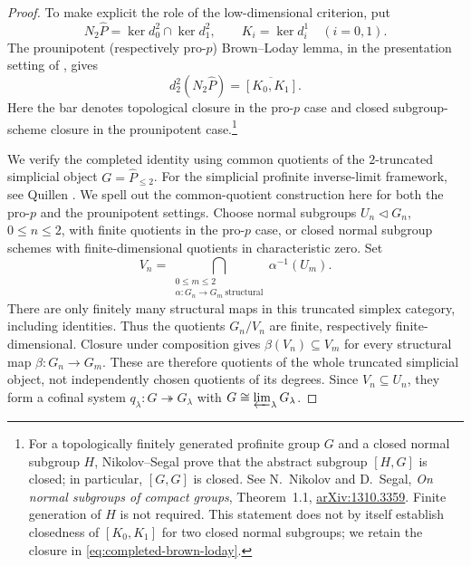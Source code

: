 \documentclass[11pt,a4paper]{article}
\begin{document}
\begin{proof}
To make explicit the role of the low-dimensional criterion, put
\[
 N_2\widehat P=\ker d_0^2\cap\ker d_1^2,
 \qquad K_i=\ker d_i^1\quad(i=0,1).
\]
The prounipotent (respectively pro-$p$) Brown--Loday lemma, in the
presentation setting of \cite[Section~4.3]{Mikh2023}, gives
\begin{equation}\label{eq:completed-brown-loday}
 d_2^2(N_2\widehat P)=\overline{[K_0,K_1]}.
\end{equation}
Here the bar denotes topological closure in the pro-$p$ case and closed
subgroup-scheme closure in the prounipotent case.\footnote{For a topologically finitely generated profinite group $G$
and a closed normal subgroup $H$, Nikolov--Segal prove that the abstract
subgroup $[H,G]$ is closed; in particular, $[G,G]$ is closed.
See N.~Nikolov and D.~Segal, \emph{On normal subgroups of compact groups},
Theorem~1.1, \href{https://arxiv.org/abs/1310.3359}{arXiv:1310.3359}.
Finite generation of $H$ is not required.  This statement does not by
itself establish closedness of $[K_0,K_1]$ for two closed normal subgroups;
we retain the closure in \eqref{eq:completed-brown-loday}.}

We verify the completed identity using common quotients of the
$2$-truncated simplicial object $G=\widehat P_{\leq2}$.
For the simplicial profinite inverse-limit framework, see Quillen
\cite{QUILLEN69}.  We spell out the common-quotient construction here
for both the pro-$p$ and the prounipotent settings.
Choose normal subgroups $U_n\triangleleft G_n$, $0\leq n\leq2$, with
finite quotients in the pro-$p$ case, or closed normal subgroup schemes
with finite-dimensional quotients in characteristic zero.  Set
\[
 V_n=\bigcap_{\substack{0\leq m\leq2\\
              \alpha:G_n\to G_m\ \mathrm{structural}}}
              \alpha^{-1}(U_m).
\]
There are only finitely many structural maps in this truncated simplex
category, including identities.  Thus the quotients $G_n/V_n$ are finite,
respectively finite-dimensional.  Closure under composition gives
$\beta(V_n)\subseteq V_m$ for every structural map
$\beta:G_n\to G_m$.  These are therefore quotients of the whole truncated
simplicial object, not independently chosen quotients of its degrees.
Since $V_n\subseteq U_n$, they form a cofinal system
$q_\lambda:G\twoheadrightarrow G_\lambda$ with
$G\cong\varprojlim_\lambda G_\lambda$.


\end{proof}
\end{document}
